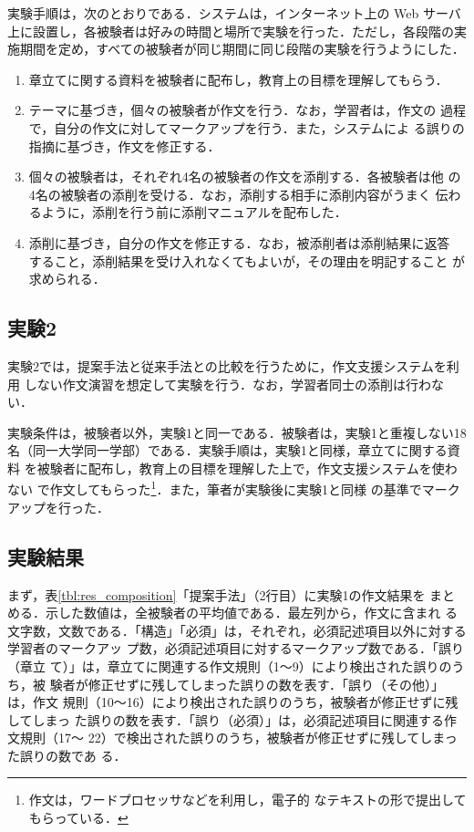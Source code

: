 \documentclass[japanese]{jnlp_1.4}
\def\mod{}
\begin{document}
実験手順は，次のとおりである．システムは，インターネット上の Web サーバ
上に設置し，各被験者は好みの時間と場所で実験を行った．ただし，各段階の実
施期間を定め，すべての被験者が同じ期間に同じ段階の実験を行うようにした．

\begin{enumerate}
 \item 章立てに関する資料を被験者に配布し，教育上の目標を理解してもらう．
 \item テーマに基づき，個々の被験者が作文を行う．なお，学習者は，作文の
       過程で，自分の作文に対してマークアップを行う．また，システムによ
       る誤りの指摘に基づき，作文を修正する．
 \item 個々の被験者は，それぞれ4名の被験者の作文を添削する．各被験者は他
       の4名の被験者の添削を受ける．なお，添削する相手に添削内容がうまく
       伝わるように，添削を行う前に添削マニュアルを配布した．
 \item 添削に基づき，自分の作文を修正する．なお，被添削者は添削結果に返答
       すること，添削結果を受け入れなくてもよいが，その理由を明記すること
       が求められる．
\end{enumerate}

{\mod
\subsection{実験2}

実験2では，提案手法と従来手法との比較を行うために，作文支援システムを利用
しない作文演習を想定して実験を行う．なお，学習者同士の添削は行わない．

実験条件は，被験者以外，実験1と同一である．被験者は，実験1と重複しない18
名（同一大学同一学部）である．実験手順は，実験1と同様，章立てに関する資料
を被験者に配布し，教育上の目標を理解した上で，作文支援システムを使わない
で作文してもらった\footnote{作文は，ワードプロセッサなどを利用し，電子的
なテキストの形で提出してもらっている．}．また，筆者が実験後に実験1と同様
の基準でマークアップを行った．
} 

\subsection{実験結果}

まず，表\ref{tbl:res_composition}「提案手法」（2行目）に実験1の作文結果を
まとめる．示した数値は，全被験者の平均値である．最左列から，作文に含まれ
る文字数，文数である．「構造」「必須」は，それぞれ，必須記述項目以外に対する学習者のマークアッ
プ数，必須記述項目に対するマークアップ数である．「誤り（章立
て）」は，章立てに関連する作文規則（1〜9）により検出された誤りのうち，被
験者が修正せずに残してしまった誤りの数を表す．「誤り（その他）」は，作文
規則（10〜16）により検出された誤りのうち，被験者が修正せずに残してしまっ
た誤りの数を表す．「誤り（必須）」は，必須記述項目に関連する作文規則（17〜
22）で検出された誤りのうち，被験者が修正せずに残してしまった誤りの数であ
る．
\end{document}
